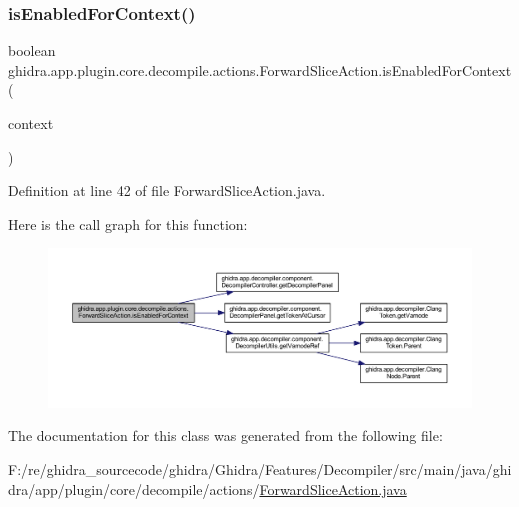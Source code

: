 \subsubsection{\texorpdfstring{isEnabledForContext()}{isEnabledForContext()}}
{\footnotesize\ttfamily boolean ghidra.\+app.\+plugin.\+core.\+decompile.\+actions.\+Forward\+Slice\+Action.\+is\+Enabled\+For\+Context (\begin{DoxyParamCaption}\item[{Action\+Context}]{context }\end{DoxyParamCaption})\hspace{0.3cm}{\ttfamily [inline]}}



Definition at line 42 of file Forward\+Slice\+Action.\+java.

Here is the call graph for this function\+:
\nopagebreak
\begin{figure}[H]
\begin{center}
\leavevmode
\includegraphics[width=350pt]{classghidra_1_1app_1_1plugin_1_1core_1_1decompile_1_1actions_1_1_forward_slice_action_a345e16519a57665243a9d06325725da2_cgraph}
\end{center}
\end{figure}


The documentation for this class was generated from the following file\+:\begin{DoxyCompactItemize}
\item 
F\+:/re/ghidra\+\_\+sourcecode/ghidra/\+Ghidra/\+Features/\+Decompiler/src/main/java/ghidra/app/plugin/core/decompile/actions/\mbox{\hyperlink{_forward_slice_action_8java}{Forward\+Slice\+Action.\+java}}\end{DoxyCompactItemize}
